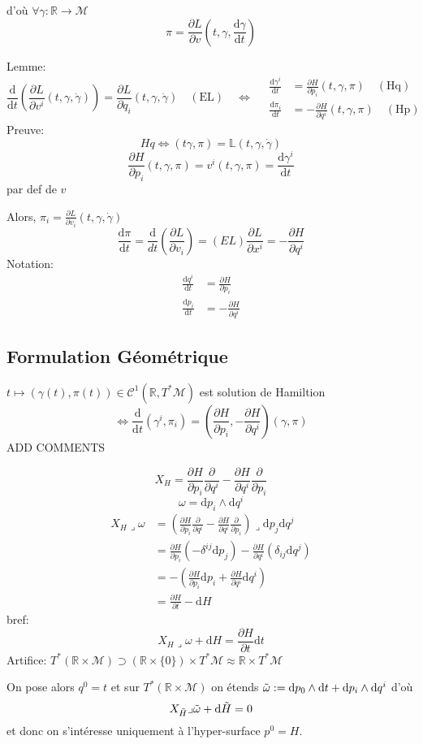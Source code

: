 \documentclass[a4paper,11pt]{article}
\renewcommand{\d}{{\mathrm{d}}}
\newcommand{\dr}[2]{\frac{\partial {#1}}{\partial{#2}}}
\begin{document}
d'où $\forall \gamma:\mathbb{R} \to \mathcal{M}$
$$\pi = \dr{L}{v}(t,\gamma,\frac{\d \gamma}{\d t})$$

Lemme:
\begin{equation}
\frac{\d}{\d t} (\dr L{v^i} (t,\gamma, \dot \gamma)) = \dr L{q_i} (t,\gamma,\dot\gamma)\quad (\mathrm{EL}) \quad \iff \quad
\begin{split} \frac{\d \gamma^i}{\d t}&=\dr{H}{p_i}(t,\gamma,\pi) \quad (\mathrm{Hq})\\
\frac{\d \pi_i}{\d t}&=-\dr{H}{q^i}(t,\gamma,\pi) \quad (\mathrm{Hp})\end{split}
\end{equation}
Preuve:
$$Hq \iff (t\gamma,\pi) = \mathbb{L}(t,\gamma,\dot\gamma)$$
$$\dr{H}{p_i}(t,\gamma,\pi)=v^i(t,\gamma,\pi)=\frac{\d \gamma^i}{\d t}$$
par def de $v$

Alors, $\pi_i = \dr{L}{v_i}(t,\gamma,\dot\gamma)$
$$\frac{\d \pi}{\d t} = \frac{\d}{d t}(\dr{L}{v_i}) = (EL) \dr{L}{x^i} = -\dr{H}{q^i}$$
Notation:
\begin{align*}
\frac{\d q^i}{\d t} &= \dr H{p_i}\\
\frac{\d p_i}{\d t} &= -\dr H{q^i}
\end{align*}

\subsection{Formulation Géométrique}
$t\mapsto (\gamma(t), \pi(t)) \in \mathcal{C}^1(\mathbb{R},T^*\mathcal{M})$ est solution de Hamiltion
$$\iff \frac{\d}{\d t}(\gamma^i, \pi_i) = (\dr H{p_i},-\dr H{q^i})(\gamma,\pi)$$
ADD COMMENTS

$$X_H = \dr H{p_i} \dr{}{q^i}-\dr H{q^i}\dr{}{p_i}$$
$$\omega = \d p_i \wedge \d q^i$$
\begin{align*}
X_H \lrcorner \omega
&= (\dr H{p_i} \dr{}{q^i}-\dr H{q^i}\dr{}{p_i}) \lrcorner \d p_j\d q^j\\
&= \dr H {p_i} (-\delta^{ij} \d p_j) - \dr H {q^i}(\delta_{ij}\d q^j)\\
&= - (\dr H {p_i} \d p_i + \dr H {q^i} \d q^i)\\
&=\dr H t - \d H
\end{align*}
bref:
$$\boxed{X_H \lrcorner \omega + \d H = \dr H t \d t}$$
Artifice: $T^*(\mathbb{R}\times\mathcal{M}) \supset (\mathbb{R}\times\{0\})\times T^*\mathcal{M}\approx\mathbb{R}\times T^*\mathcal{M} $

On pose alors $q^0 = t$ et sur $T^*(\mathbb{R}\times\mathcal{M})$ on étends $\Tilde \omega:= \d p_0 \wedge \d t + \d p_i \wedge \d q^i$ d'où
$$X_{\Tilde H} \lrcorner \Tilde \omega + \d \Tilde H=0$$
et donc on s'intéresse uniquement à l'hyper-surface $p^0 = H$.
\end{document}

